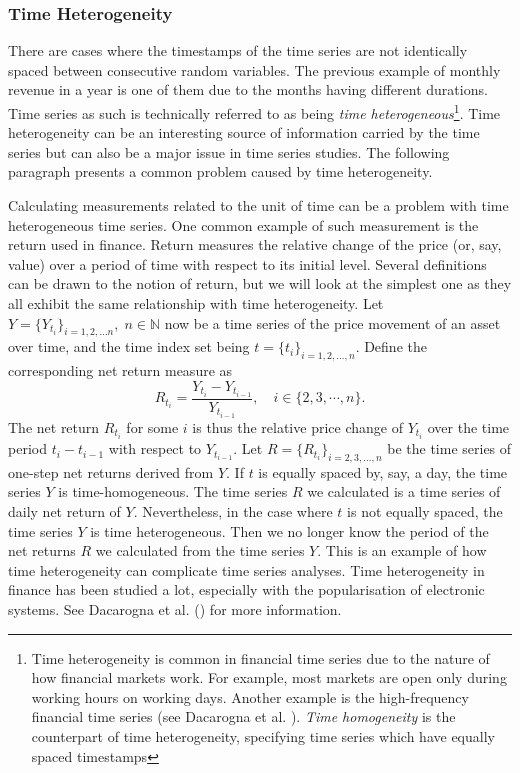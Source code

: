 \subsubsection{Time Heterogeneity}
There are cases where the timestamps of the time series are not identically spaced between consecutive random variables. The previous example of monthly revenue in a year is one of them due to the months having different durations. Time series as such is technically referred to as being \textit{time heterogeneous}\footnote{Time heterogeneity is common in financial time series due to the nature of how financial markets work. For example, most markets are open only during working hours on working days. Another example is the high-frequency financial time series (see Dacarogna et al. \citeyear{genccay2001introduction}). \textit{Time homogeneity} is the counterpart of time heterogeneity, specifying time series which have equally spaced timestamps}. Time heterogeneity can be an interesting source of information carried by the time series but can also be a major issue in time series studies. The following paragraph presents a common problem caused by time heterogeneity.

Calculating measurements related to the unit of time can be a problem with time heterogeneous time series. One common example of such measurement is the return used in finance. Return measures the relative change of the price (or, say, value) over a period of time with respect to its initial level. Several definitions can be drawn to the notion of return, but we will look at the simplest one as they all exhibit the same relationship with time heterogeneity. Let $Y = \{ Y_{t_i} \}_{i = 1, 2, \ldots n}, \; n \in \mathbb{N}$ now be a time series of the price movement of an asset over time, and the time index set being $t = \{ t_i \}_{i = 1, 2, \ldots, n}$. Define the corresponding net return measure as
\begin{equation}\label{eq: return}
R_{t_i} = \frac{Y_{t_i} - Y_{t_{i-1}}}{Y_{t_{i-1}}}, \quad i \in \{2, 3, \cdots, n \}.
\end{equation}
The net return $R_{t_i}$ for some $i$ is thus the relative price change of $Y_{t_i}$ over the time period $t_i - t_{i-1}$ with respect to $Y_{t_{i-1}}$. Let $R = \{ R_{t_i} \}_{i = 2, 3, \ldots, n}$ be the time series of one-step net returns derived from $Y$. If $t$ is equally spaced by, say, a day, the time series $Y$ is time-homogeneous. The time series $R$ we calculated is a time series of daily net return of $Y$. Nevertheless, in the case where $t$ is not equally spaced, the time series $Y$ is time heterogeneous. Then we no longer know the period of the net returns $R$ we calculated from the time series $Y$. This is an example of how time heterogeneity can complicate time series analyses. Time heterogeneity in finance has been studied a lot, especially with the popularisation of electronic systems. See Dacarogna et al. (\citeyear{genccay2001introduction}) for more information.

